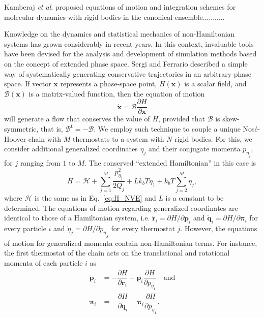 \documentclass[aip,jcp,reprint,amsmath,amssymb]{revtex4-1}
\newcommand{\vt}[1]{\boldsymbol{\mathbf{#1}}}           %
\newcommand{\tr}[1]{#1^\text{t}}                        %
\newcommand{\diff}[2]{\dfrac{\partial #1}{\partial #2}} %
\begin{document}
Kamberaj \textit{et al}.\cite{Kamberaj2005} proposed equations of motion and integration schemes for molecular dynamics with rigid bodies in the canonical ensemble...........

Knowledge on the dynamics and statistical mechanics of non-Hamiltonian systems has grown considerably in recent years.\cite{Tuckerman_1999, Tuckerman2001, Sergi2001, Sergi2003, Ezra2004, Sergi2004, Ezra2006, Sergi2010b} In this context, invaluable tools have been devised for the analysis and development of simulation methods based on the concept of extended phase space. Sergi and Ferrario\cite{Sergi2001} described a simple way of systematically generating conservative trajectories in an arbitrary phase space. If vector $\vt x$ represents a phase-space point, $H(\vt x)$ is a scalar field, and $\boldsymbol{\mathcal B}(\vt x)$ is a matrix-valued function, then the equation of motion
\begin{equation} \label{eq:eq_of_motion}
\dot{\vt x} = \boldsymbol{\mathcal B}\diff{H}{\vt x}
\end{equation}
will generate a flow that conserves the value of $H$, provided that $\boldsymbol{\mathcal B}$ is skew-symmetric, that is, $\tr{ \boldsymbol{ \mathcal B }} = -\boldsymbol{ \mathcal B }$. We employ such technique to couple a unique Nos\'{e}-Hoover chain\cite{Martyna1992} with $M$ thermostats to a system with $N$ rigid bodies. For this, we consider additional generalized coordinates $\eta_j$ and their conjugate momenta $p_{\eta_j}$, for $j$ ranging from $1$ to $M$. The conserved ``extended Hamiltonian'' in this case is
\begin{equation}
\label{eq:H_nvt}
H = \mathcal{H} + \sum_{j=1}^{M}\frac{p_{\eta_j}^2}{2Q_j} + L k_bT\eta_1 + k_bT\sum_{j=2}^M \eta_j,
\end{equation}
where $\mathcal H$ is the same as in Eq.~\ref{eq:H_NVE} and $L$ is a constant to be determined. The equations of motion regarding generalized coordinates are identical to those of a Hamiltonian system, i.e. $\dot{\vt r}_i = {\partial H}/{\partial \vt p_i}$ and $\dot{\vt q}_i = {\partial H}/{\partial \vt \pi_i}$ for every particle $i$ and $\dot{\eta}_j = {\partial H}/{\partial {p_\eta}_j}$ for every thermostat $j$. However, the equations of motion for generalized momenta contain non-Hamiltonian terms. For instance, the first thermostat of the chain acts on the translational and rotational momenta of each particle $i$ as
\[
\begin{split}
\dot{\vt p}_i &= -\diff{H}{\vt r_i} - {\vt p}_i \diff{H}{p_{\eta_1}} \quad \text{and} \\
\dot{\vt \pi}_i &= -\diff{H}{\vt q_i} - {\vt \pi}_i \diff{H}{p_{\eta_1}}.
\end{split}
\]
\end{document}
